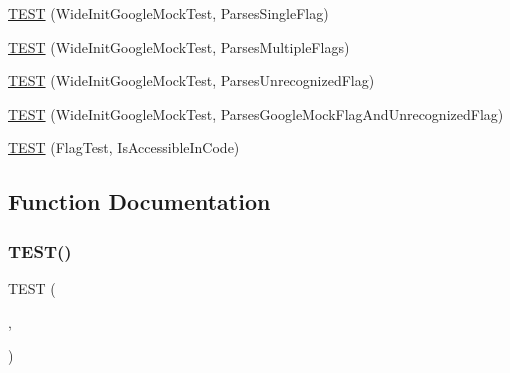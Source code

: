\begin{DoxyCompactItemize}
\item 
\mbox{\hyperlink{_obj__test_2lib_2googletest-release-1_88_81_2googlemock_2test_2gmock__test_8cc_ab4288bcdb1b8464596f24c7384c72eb4}{T\+E\+ST}} (Wide\+Init\+Google\+Mock\+Test, Parses\+Single\+Flag)
\item 
\mbox{\hyperlink{_obj__test_2lib_2googletest-release-1_88_81_2googlemock_2test_2gmock__test_8cc_a00a9cde83573de9c598297cb89020e69}{T\+E\+ST}} (Wide\+Init\+Google\+Mock\+Test, Parses\+Multiple\+Flags)
\item 
\mbox{\hyperlink{_obj__test_2lib_2googletest-release-1_88_81_2googlemock_2test_2gmock__test_8cc_a29f97c351b2c31a05b34d7c63bb06392}{T\+E\+ST}} (Wide\+Init\+Google\+Mock\+Test, Parses\+Unrecognized\+Flag)
\item 
\mbox{\hyperlink{_obj__test_2lib_2googletest-release-1_88_81_2googlemock_2test_2gmock__test_8cc_a6d85c181697be8603091b049564cf5c6}{T\+E\+ST}} (Wide\+Init\+Google\+Mock\+Test, Parses\+Google\+Mock\+Flag\+And\+Unrecognized\+Flag)
\item 
\mbox{\hyperlink{_obj__test_2lib_2googletest-release-1_88_81_2googlemock_2test_2gmock__test_8cc_a737c00dcd21d5b1ef3d9299cab7a51d3}{T\+E\+ST}} (Flag\+Test, Is\+Accessible\+In\+Code)
\end{DoxyCompactItemize}


\subsection{Function Documentation}
\mbox{\label{_obj__test_2lib_2googletest-release-1_88_81_2googlemock_2test_2gmock__test_8cc_a7c86c6c98b72e903135c1b01370a13f3}} 
\subsubsection{\texorpdfstring{TEST()}{TEST()}\hspace{0.1cm}{\footnotesize\ttfamily [1/13]}}
{\footnotesize\ttfamily T\+E\+ST (\begin{DoxyParamCaption}\item[{Init\+Google\+Mock\+Test}]{,  }\item[{Parses\+Invalid\+Command\+Line}]{ }\end{DoxyParamCaption})}

\mbox{\label{_obj__test_2lib_2googletest-release-1_88_81_2googlemock_2test_2gmock__test_8cc_a29b51be89eb52fa64713438ecf4ab924}} 
